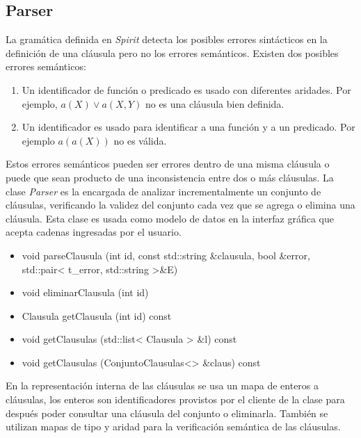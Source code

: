 \documentclass[a4paper,12pt]{article}
\begin{document}
\subsection{Parser}
La gramática definida en \emph{Spirit} detecta los posibles errores sintácticos en la definición
de una cláusula pero no los errores semánticos. Existen dos posibles errores semánticos:
\begin{enumerate}
\item Un identificador de función o predicado es usado con diferentes aridades. Por ejemplo, $a(X) \lor a(X,Y)$ no
es una cláusula bien definida.
\item Un identificador es usado para identificar a una función y a un predicado. Por ejemplo $a(a(X))$ no es válida.
\end{enumerate}
Estos errores semánticos pueden ser errores dentro de una misma cláusula o puede que sean producto de una
inconsistencia entre dos o más cláusulas. La clase \emph{Parser} es la encargada de analizar incrementalmente
un conjunto de cláusulas, verificando la validez del conjunto cada vez que se agrega o elimina una cláusula.
Esta clase es usada como modelo de datos en la interfaz gráfica que acepta cadenas ingresadas por el usuario.
\begin{itemize}
\renewcommand{\labelitemi}{$\bullet$}
\item void parseClausula (int id, const std::string \&clausula, bool \&error, std::pair< t\_error, std::string >\&E)
\item void eliminarClausula (int id)
\item Clausula getClausula (int id) const
\item void getClausulas (std::list< Clausula > \&l) const
\item void getClausulas (ConjuntoClausulas<> \&claus) const
\end{itemize}
En la representación interna de las cláusulas se usa un mapa de enteros a cláusulas, los enteros
son identificadores provistos por el cliente de la clase para después poder consultar una cláusula
del conjunto o eliminarla. También se utilizan mapas de tipo y aridad para la verificación semántica
de las cláusulas.


\end{document}
